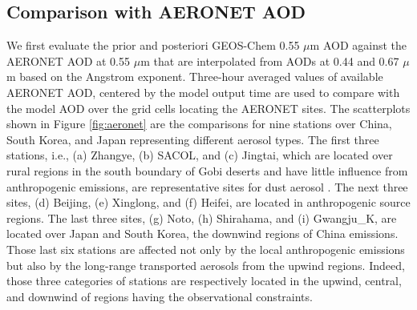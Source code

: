  \subsection{Comparison with AERONET AOD}

 We first evaluate the prior and posteriori GEOS-Chem 0.55 $\mu$m AOD against
 the AERONET AOD at 0.55 $\mu$m that are interpolated from AODs at 0.44 and 0.67 $\mu$m
 based on the Angstrom exponent.
 Three-hour averaged values of available AERONET AOD,
 centered by the model output time are used to compare with
 the model AOD over the grid cells locating the AERONET sites.
 The scatterplots shown in Figure \ref{fig:aeronet} are the comparisons
 for nine stations over China, South Korea, and Japan representing different aerosol types.
 The first three stations, i.e., (a) Zhangye, (b) SACOL, and (c) Jingtai,
 which are located over rural regions in the south boundary of Gobi deserts
 and have little influence from anthropogenic emissions,
 are representative sites for dust aerosol \citep{ge10}.
 The next three sites, (d) Beijing, (e) Xinglong, and (f) Heifei,
 are located in anthropogenic source regions.
 The last three sites, (g) Noto, (h) Shirahama, and (i) Gwangju\_K,
 are located over Japan and South Korea, the downwind regions of China emissions.
 Those last six stations are affected not only by the local anthropogenic emissions
 but also by the long-range transported aerosols from the upwind regions.
 Indeed, those three categories of stations are respectively located
 in the upwind, central, and downwind of regions having the observational constraints.

